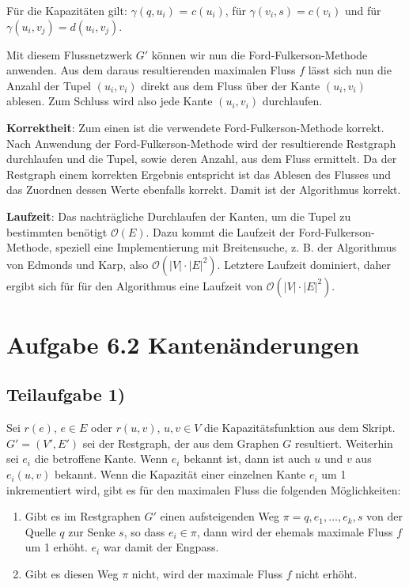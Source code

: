 \documentclass[a4paper, fontsize=10pt]{scrartcl}
\begin{document}
Für die Kapazitäten gilt: $\gamma(q,u_i)$ = $c(u_i)$, für $\gamma(v_i,s)=c(v_i)$ und für $\gamma(u_i,v_j)=d(u_i,v_j)$.

Mit diesem Flussnetzwerk $G'$ können wir nun die Ford-Fulkerson-Methode anwenden. Aus dem daraus resultierenden maximalen Fluss $f$ lässt sich nun die Anzahl der Tupel $(u_i,v_i)$ direkt aus dem Fluss über der Kante $(u_i,v_i)$ ablesen. Zum Schluss wird also jede Kante $(u_i,v_i)$ durchlaufen.\bigskip

\textbf{Korrektheit}:
Zum einen ist die verwendete Ford-Fulkerson-Methode korrekt. Nach Anwendung der Ford-Fulkerson-Methode wird der resultierende Restgraph durchlaufen und die Tupel, sowie deren Anzahl, aus dem Fluss ermittelt. Da der Restgraph einem korrekten Ergebnis entspricht ist das Ablesen des Flusses und das Zuordnen dessen Werte ebenfalls korrekt. Damit ist der Algorithmus korrekt. \bigskip

\textbf{Laufzeit}:
Das nachträgliche Durchlaufen der Kanten, um die Tupel zu bestimmten benötigt $\mathcal{O}(E)$. Dazu kommt die Laufzeit der Ford-Fulkerson-Methode, speziell eine Implementierung mit Breitensuche, z. B. der Algorithmus von Edmonds und Karp, also $\mathcal{O}(|V|\cdot |E|^2)$. Letztere Laufzeit dominiert, daher ergibt sich für für den Algorithmus eine Laufzeit von $\mathcal{O}(|V|\cdot |E|^2)$. 



\section*{Aufgabe 6.2 Kantenänderungen}
\subsection*{Teilaufgabe 1)}
Sei $r(e)$, $e\in E$ oder $r(u,v)$, $u,v\in V$ die Kapazitätsfunktion aus dem Skript. $G'=(V',E')$ sei der Restgraph, der aus dem Graphen $G$ resultiert. Weiterhin sei $e_i$ die betroffene Kante. Wenn $e_i$ bekannt ist, dann ist auch $u$ und $v$ aus $e_i(u,v)$ bekannt. Wenn die Kapazität einer einzelnen Kante $e_i$ um 1 inkrementiert wird, gibt es für den maximalen Fluss die folgenden Möglichkeiten: 
\begin{enumerate}
  \item Gibt es im Restgraphen $G'$ einen aufsteigenden Weg $\pi=q,e_1,\dots, e_k,s$ von der Quelle $q$ zur Senke $s$, so dass $e_i\in \pi$, dann wird der ehemals maximale Fluss $f$ um 1 erhöht. $e_i$ war damit der Engpass.
  \item Gibt es diesen Weg $\pi$ nicht, wird der maximale Fluss $f$ nicht erhöht. 
\end{enumerate}
\end{document}
